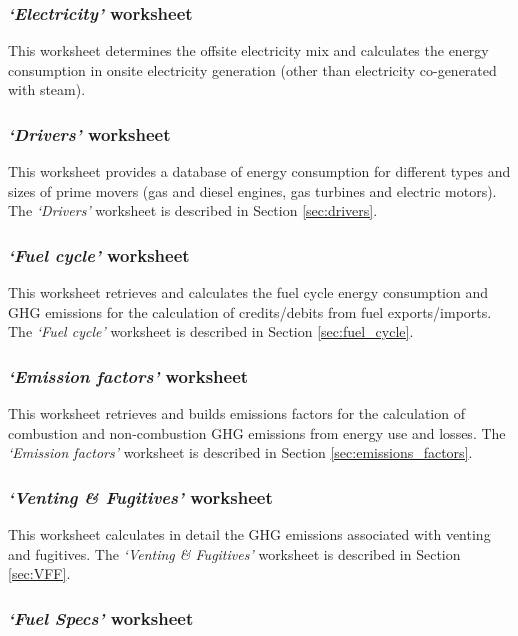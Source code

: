 \documentclass[11pt]{report}
\newcommand{\sheet}[1]{\textit{`{#1}'}}
\begin{document}
\subsubsection{\sheet{Electricity} worksheet}

This worksheet determines the offsite electricity mix and calculates the energy consumption in onsite electricity generation (other than electricity co-generated with steam).

\subsubsection{\sheet{Drivers} worksheet} 

This worksheet provides a database of energy consumption for different types and sizes of prime movers (gas and diesel engines, gas turbines and electric motors). The \sheet{Drivers} worksheet is described in Section \ref{sec:drivers}.

\subsubsection{\sheet{Fuel cycle} worksheet}

This worksheet retrieves and calculates the fuel cycle energy consumption and GHG emissions for the calculation of credits/debits from fuel exports/imports. The \sheet{Fuel cycle} worksheet is described in Section \ref{sec:fuel_cycle}.

\subsubsection{\sheet{Emission factors} worksheet} 

This worksheet retrieves and builds emissions factors for the calculation of combustion and non-combustion GHG emissions from energy use and losses. The \sheet{Emission factors} worksheet is described in Section \ref{sec:emissions_factors}.

\subsubsection{\sheet{Venting & Fugitives} worksheet} 

This worksheet calculates in detail the GHG emissions associated with venting and fugitives. The \sheet{Venting & Fugitives} worksheet is described in Section \ref{sec:VFF}.

\subsubsection{\sheet{Fuel Specs} worksheet}
\end{document}
